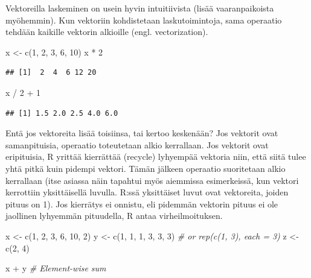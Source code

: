 \documentclass[
]{book}
\newenvironment{Shaded}{\begin{snugshade}}{\end{snugshade}}
\newcommand{\CommentTok}[1]{\textcolor[rgb]{0.56,0.35,0.01}{\textit{#1}}}
\newcommand{\DecValTok}[1]{\textcolor[rgb]{0.00,0.00,0.81}{#1}}
\newcommand{\FunctionTok}[1]{\textcolor[rgb]{0.00,0.00,0.00}{#1}}
\newcommand{\NormalTok}[1]{#1}
\newcommand{\OtherTok}[1]{\textcolor[rgb]{0.56,0.35,0.01}{#1}}
\newcommand{\SpecialCharTok}[1]{\textcolor[rgb]{0.00,0.00,0.00}{#1}}
\begin{document}
Vektoreilla laskeminen on usein hyvin intuitiivista (lisää vaaranpaikoista myöhemmin). Kun vektoriin kohdistetaan laskutoimintoja, sama operaatio tehdään kaikille vektorin alkioille (engl. vectorization).

\begin{Shaded}
\begin{Highlighting}[]
\NormalTok{x }\OtherTok{\textless{}{-}} \FunctionTok{c}\NormalTok{(}\DecValTok{1}\NormalTok{, }\DecValTok{2}\NormalTok{, }\DecValTok{3}\NormalTok{, }\DecValTok{6}\NormalTok{, }\DecValTok{10}\NormalTok{)}
\NormalTok{x }\SpecialCharTok{*} \DecValTok{2}
\end{Highlighting}
\end{Shaded}

\begin{verbatim}
## [1]  2  4  6 12 20
\end{verbatim}

\begin{Shaded}
\begin{Highlighting}[]
\NormalTok{x }\SpecialCharTok{/} \DecValTok{2} \SpecialCharTok{+} \DecValTok{1}
\end{Highlighting}
\end{Shaded}

\begin{verbatim}
## [1] 1.5 2.0 2.5 4.0 6.0
\end{verbatim}

Entä jos vektoreita lisää toisiinsa, tai kertoo keskenään? Jos vektorit ovat samanpituisia, operaatio toteutetaan alkio kerrallaan. Jos vektorit ovat eripituisia, R yrittää kierrättää (recycle) lyhyempää vektoria niin, että siitä tulee yhtä pitkä kuin pidempi vektori. Tämän jälkeen operaatio suoritetaan alkio kerrallaan (itse asiassa näin tapahtui myös aiemmissa esimerkeissä, kun vektori kerrottiin yksittäisellä luvulla. R:ssä yksittäiset luvut ovat vektoreita, joiden pituus on 1). Jos kierrätys ei onnistu, eli pidemmän vektorin pituus ei ole jaollinen lyhyemmän pituudella, R antaa virheilmoituksen.

\begin{Shaded}
\begin{Highlighting}[]
\NormalTok{x }\OtherTok{\textless{}{-}} \FunctionTok{c}\NormalTok{(}\DecValTok{1}\NormalTok{, }\DecValTok{2}\NormalTok{, }\DecValTok{3}\NormalTok{, }\DecValTok{6}\NormalTok{, }\DecValTok{10}\NormalTok{, }\DecValTok{2}\NormalTok{)}
\NormalTok{y }\OtherTok{\textless{}{-}} \FunctionTok{c}\NormalTok{(}\DecValTok{1}\NormalTok{, }\DecValTok{1}\NormalTok{, }\DecValTok{1}\NormalTok{, }\DecValTok{3}\NormalTok{, }\DecValTok{3}\NormalTok{, }\DecValTok{3}\NormalTok{) }\CommentTok{\# or rep(c(1, 3), each = 3)}
\NormalTok{z }\OtherTok{\textless{}{-}} \FunctionTok{c}\NormalTok{(}\DecValTok{2}\NormalTok{, }\DecValTok{4}\NormalTok{)}

\NormalTok{x }\SpecialCharTok{+}\NormalTok{ y }\CommentTok{\# Element{-}wise sum}
\end{Highlighting}
\end{Shaded}
\end{document}
